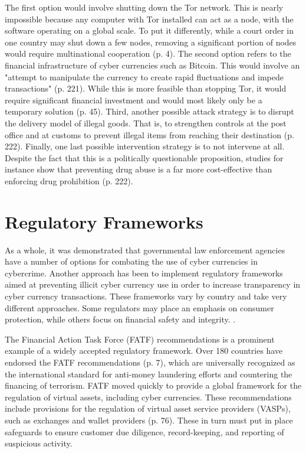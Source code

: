 The first option would involve shutting down the Tor network. This is nearly impossible because any computer with Tor installed can act as a node, with the software operating on a global scale. To put it differently, while a court order in one country may shut down a few nodes, removing a significant portion of nodes would require multinational cooperation \cite{dingledine_design_2006} (p. 4). 
The second option refers to the financial infrastructure of cyber currencies such as Bitcoin. This would involve an "attempt to manipulate the currency to create rapid fluctuations and impede transactions" \cite{christin_traveling_2013} (p. 221). While this is more feasible than stopping Tor, it would require significant financial investment and would most likely only be a temporary solution \cite{lacson_21st_2016} (p. 45). 
Third, another possible attack strategy is to disrupt the delivery model of illegal goods. That is, to strengthen controls at the post office and at customs to prevent illegal items from reaching their destination \cite{christin_traveling_2013} (p. 222). Finally, one last possible intervention strategy is to not intervene at all. Despite the fact that this is a politically questionable proposition, studies for instance show that preventing drug abuse is a far more cost-effective than enforcing drug prohibition \cite{christin_traveling_2013} (p. 222).

\section{Regulatory Frameworks}
As a whole, it was demonstrated that governmental law enforcement agencies have a number of options for combating the use of cyber currencies in cybercrime. Another approach has been to implement regulatory frameworks aimed at preventing illicit cyber currency  use in order to increase transparency in cyber currency transactions. These frameworks vary by country and take very different approaches. Some regulators may place an emphasis on consumer protection, while others focus on financial safety and integrity. \cite{narain_aditya_regulating_2022}. 

The Financial Action Task Force (FATF) recommendations is a prominent example of a widely accepted regulatory framework. Over 180 countries have endorsed the FATF recommendations \cite{financial_action_task_force_fatf_2012} (p. 7), which are universally recognized as the international standard for anti-money laundering efforts and countering the financing of terrorism. FATF moved quickly to provide a global framework for the regulation of virtual assets, including cyber currencies. These recommendations include provisions for the regulation of virtual asset service providers (VASPs), such as exchanges and wallet providers \cite{financial_action_task_force_fatf_2012} (p. 76). These in turn must put in place safeguards to ensure customer due diligence, record-keeping, and reporting of suspicious activity.

